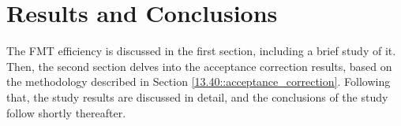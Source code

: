 \section{Results and Conclusions}
\label{14::results_and_conclusions}
    The FMT efficiency is discussed in the first section, including a brief study of it.
    Then, the second section delves into the acceptance correction results, based on the methodology described in Section \ref{13.40::acceptance_correction}.
    Following that, the study results are discussed in detail, and the conclusions of the study follow shortly thereafter.

    
    
    

